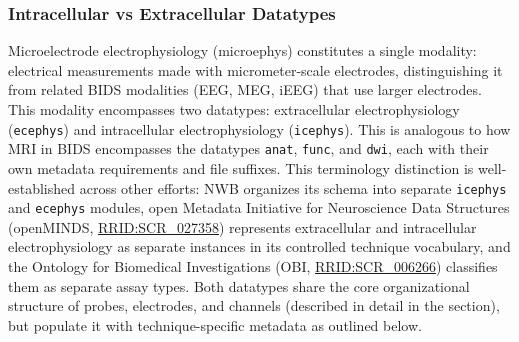 \documentclass[fleqn,10pt]{article}
\newcommand{\rrid}[1]{\href{https://scicrunch.org/resolver/#1}{#1}}
\begin{document}

\subsubsection*{Intracellular vs Extracellular Datatypes}\label{sec:ic-vs-ec}

Microelectrode electrophysiology (microephys) constitutes a single modality: electrical measurements made with micrometer-scale electrodes, distinguishing it from related BIDS modalities (EEG, MEG, iEEG) that use larger electrodes.
This modality encompasses two datatypes: extracellular electrophysiology (\texttt{ecephys}) and intracellular electrophysiology (\texttt{icephys}).
This is analogous to how MRI in BIDS encompasses the datatypes \texttt{anat}, \texttt{func}, and \texttt{dwi}, each with their own metadata requirements and file suffixes.
This terminology distinction is well-established across other efforts: NWB organizes its schema into separate \texttt{icephys} and \texttt{ecephys} modules, open Metadata Initiative for Neuroscience Data Structures (openMINDS, \rrid{RRID:SCR\_027358}) represents extracellular and intracellular electrophysiology as separate instances in its controlled technique vocabulary, and the Ontology for Biomedical Investigations (OBI, \rrid{RRID:SCR\_006266}) classifies them as separate assay types.
Both datatypes share the core organizational structure of probes, electrodes, and channels (described in detail in the  section), but populate it with technique-specific metadata as outlined below.
\end{document}
